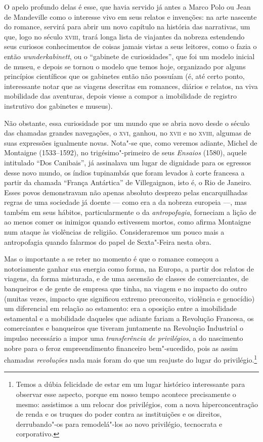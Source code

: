 O apelo profundo delas é esse, que havia servido já antes a Marco Polo
ou Jean de Mandeville como o interesse vivo em seus relatos e invenções:
na arte nascente do romance, servirá para abrir um novo capítulo na
história das narrativas, um que, logo no século \textsc{xviii}, trará longa lista
de viajantes da nobreza estendendo seus curiosos conhecimentos de coisas
jamais vistas a seus leitores, como o fazia o então
\emph{wunderkabinett}, ou o ``gabinete de curiosidades'', que foi um
modelo inicial de museu, e depois se tornou o modelo que temos hoje,
organizado por alguns princípios científicos que os gabinetes então não
possuíam (é, até certo ponto, interessante notar que as viagens
descritas em romances, diários e relatos, na viva mobilidade das
aventuras, depois viesse a compor a imobilidade de registro instrutivo
dos gabinetes e museus).

Não obstante, essa curiosidade por um mundo que se abria novo desde o
século das chamadas grandes navegações, o \textsc{xvi}, ganhou, no \textsc{xvii} e no
\textsc{xviii}, algumas de suas expressões igualmente novas. Nota"-se que, como
veremos adiante, Michel de Montaigne (1533--1592), no trigésimo"-primeiro
de seus \emph{Ensaios} (1580), aquele intitulado ``Dos Canibais'', já
assinalava um lugar de dignidade para os egressos desse novo mundo, os
índios tupinambás que foram levados à corte francesa a partir da chamada
``França Antártica'' de Villegaignon, isto é, o Rio de Janeiro. Esses
povos demonstravam não apenas absoluto desprezo pelas encarquilhadas
regras de uma sociedade já doente --- como era a da nobreza europeia
---, mas também em seus hábitos, particularmente o da
\emph{antropofagia}, forneciam a lição de ao menos comer os inimigos
quando estivessem mortos, como afirma Montaigne num ataque às violências
de religião. Consideraremos um pouco mais a antropofagia quando falarmos
do papel de Sexta"-Feira nesta obra.

Mas o importante a se reter no momento é que o romance começou a
notoriamente ganhar sua energia como forma, na Europa, a partir dos
relatos de viagens, da forma misturada, e de uma ascensão de classes de
comerciantes, de banqueiros e de gente de empresa que tinha, na viagem e
no impacto do outro (muitas vezes, impacto que significou extremo
preconceito, violência e genocídio) um diferencial em relação ao
estamento: era a oposição entre a imobilidade estamental e a mobilidade
daqueles que adiante fariam a Revolução Francesa, os comerciantes e
banqueiros que tiveram juntamente na Revolução Industrial o impulso
necessário a impor uma \emph{transferência de privilégios}, a do
nascimento nobre para o feroz empreendimento financeiro bem"-sucedido,
pois as assim chamadas \emph{revoluções} nada mais foram do que um
reajuste do lugar do privilégio.\footnote{Temos a dúbia felicidade de
  estar em um lugar histórico interessante para observar esse aspecto,
  porque em nosso tempo acontece precisamente o mesmo: assistimos a um
  relocar dos privilégios, com a nova hiperconcentração de renda e os
  truques do poder contra as instituições e os direitos, derrubando"-os
  para remodelá"-los ao novo privilégio, tecnocrata e corporativo.}
